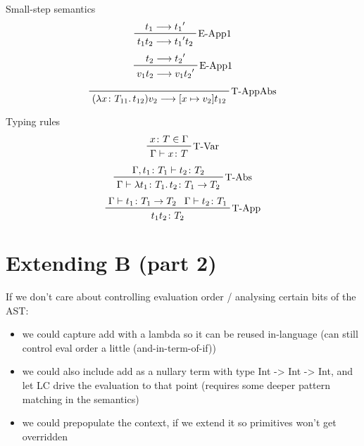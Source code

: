 \documentclass{beamer}
\begin{document}
\begin{frame}
  Small-step semantics
  \begin{displaymath}  
    \prftree[r]{E-App1}
    {t_1 \longrightarrow {t_1}^{\prime} }
    {t_1 t_2 \longrightarrow {t_1}^{\prime} t_2}
  \end{displaymath}  
  \begin{displaymath}  
    \prftree[r]{E-App1}
    {t_2 \longrightarrow {t_2}^{\prime} }
    {v_1 t_2 \longrightarrow v_1 {t_2}^{\prime}}
  \end{displaymath}  
  \begin{displaymath}  
    \prftree[r]{T-AppAbs}
    {(\lambda x \colon T_{11} \ldotp t_{12})v_2 \longrightarrow [x \mapsto v_2]t_{12}}
  \end{displaymath}  
\end{frame}

\begin{frame}
  Typing rules
  \begin{displaymath}  
    \prftree[r]{T-Var}
    {x \colon T \in \Gamma}
    {\Gamma \vdash x \colon T}
  \end{displaymath}  
  \begin{displaymath}  
    \prftree[r]{T-Abs}
    {\Gamma, t_1 \colon T_1 \vdash t_2 \colon T_2}
    {\Gamma \vdash \lambda t_1 \colon T_1 \ldotp t_2 \colon T_1 \rightarrow T_2}
  \end{displaymath}  
  \begin{displaymath}  
    \prftree[r]{T-App}
    {\Gamma \vdash t_1 \colon T_1 \rightarrow T_2}
    {\Gamma \vdash t_2 \colon T_1}
    {t_1 t_2 \colon T_2}
  \end{displaymath}  
\end{frame}


\section{Extending B (part 2)}

If we don't care about controlling evaluation order / analysing certain bits of
the AST:
\begin{itemize}
\item we could capture add with a lambda so it can be reused in-language (can
  still control eval order a little (and-in-term-of-if))
\item we could also include add as a nullary term with type Int -> Int -> Int, and let LC drive the
  evaluation to that point (requires some deeper pattern matching in the semantics)
\item we could prepopulate the context, if we extend it so primitives won't get overridden
\end{itemize}
\end{document}
